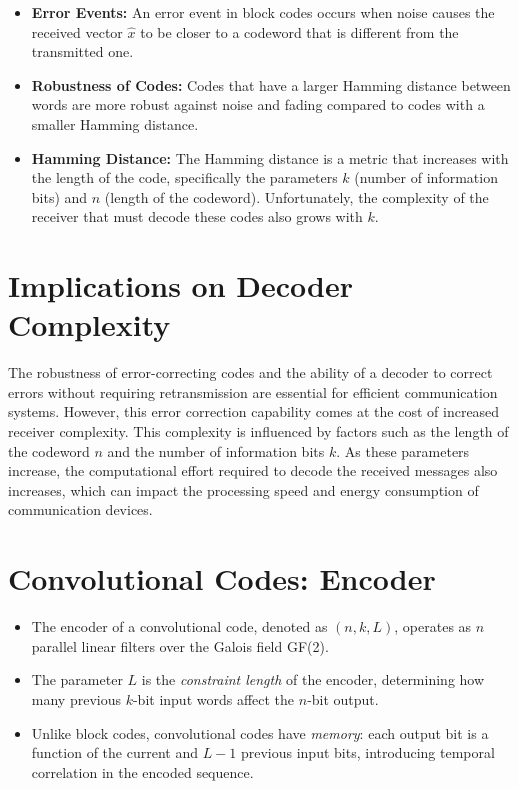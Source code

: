 \begin{itemize}
    \item \textbf{Error Events:} An error event in block codes occurs when noise causes the received vector \(\hat{x}\) to be closer to a codeword that is different from the transmitted one.
    \item \textbf{Robustness of Codes:} Codes that have a larger Hamming distance between words are more robust against noise and fading compared to codes with a smaller Hamming distance.
    \item \textbf{Hamming Distance:} The Hamming distance is a metric that increases with the length of the code, specifically the parameters \(k\) (number of information bits) and \(n\) (length of the codeword). Unfortunately, the complexity of the receiver that must decode these codes also grows with \(k\).
\end{itemize}

\section*{Implications on Decoder Complexity}

The robustness of error-correcting codes and the ability of a decoder to correct errors without requiring retransmission are essential for efficient communication systems. However, this error correction capability comes at the cost of increased receiver complexity. This complexity is influenced by factors such as the length of the codeword \(n\) and the number of information bits \(k\). As these parameters increase, the computational effort required to decode the received messages also increases, which can impact the processing speed and energy consumption of communication devices.


\section*{Convolutional Codes: Encoder}

\begin{itemize}
    \item The encoder of a convolutional code, denoted as \((n, k, L)\), operates as \(n\) parallel linear filters over the Galois field GF(2).
    \item The parameter \(L\) is the \emph{constraint length} of the encoder, determining how many previous \(k\)-bit input words affect the \(n\)-bit output.
    \item Unlike block codes, convolutional codes have \emph{memory}: each output bit is a function of the current and \(L-1\) previous input bits, introducing temporal correlation in the encoded sequence.
\end{itemize}

